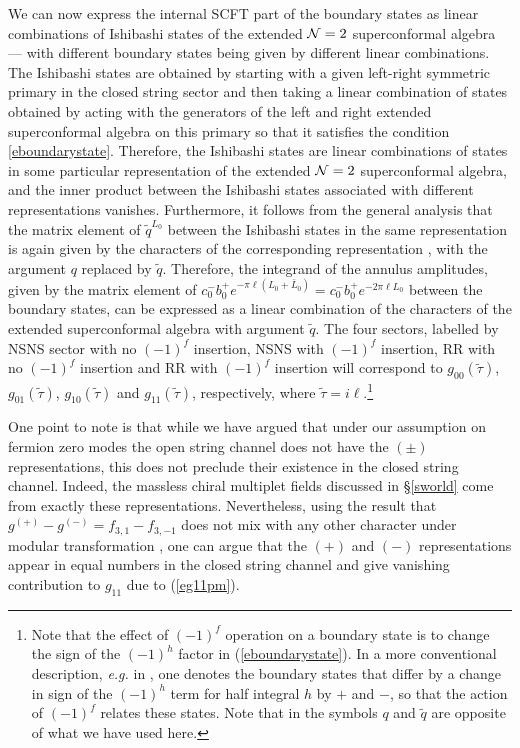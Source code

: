 \documentclass[12pt,a4paper]{article}
\newcommand{\refb}[1]{(\ref{#1})}
\newcommand{\NN}{{\cal N}}
\def\ttau{\tilde\tau}
\begin{document}
We can now express the internal SCFT part of the boundary states as
linear combinations of Ishibashi states \cite{Ishibashi:1988kg} of the
extended $\NN=2$ superconformal algebra --- with different boundary states being given by different linear
combinations. The Ishibashi states are obtained by starting with a given left-right
symmetric primary in the closed string sector and then taking a linear combination
of states obtained by acting with the generators of the left and right extended superconformal
algebra on this primary so that it satisfies the condition \eqref{eboundarystate}.
Therefore, the Ishibashi states are linear combinations of states in some particular
representation of the extended $\NN=2$ superconformal algebra, and the inner product between the Ishibashi states
associated with different representations vanishes. Furthermore, it follows from the general
analysis that the matrix element of $\tilde q^{L_0}$ between the Ishibashi states in the same
representation is again given by the characters of the corresponding
representation \cite{Recknagel:1997sb}, with the argument $q$ replaced by $\tilde q$.
Therefore, the integrand of the annulus amplitudes, given by the matrix element of
$c_0^-b_0^+e^{-\pi\ell (L_0+\bar L_0)}=c_0^-b_0^+ e^{-2\pi\ell L_0}$
between the boundary states, can be expressed as a linear combination of the characters of the extended superconformal
algebra with argument $\tilde q$. The four sectors,
labelled by NSNS sector with no $(-1)^f$ insertion, NSNS with $(-1)^f$ insertion, RR with
no $(-1)^f$ insertion and RR with $(-1)^f$ insertion will correspond to $g_{00}(\ttau)$,
$g_{01}(\ttau)$, $g_{10}(\ttau)$ and $g_{11}(\ttau)$, respectively, where
$\ttau=i\ell$.\footnote{Note that the effect
of $(-1)^f$ operation on a boundary state is to change the sign of the $(-1)^h$ factor in
\refb{eboundarystate}. In a more conventional description, {\it e.g.} in \cite{Quiroz:2001xz},
one denotes the boundary states
that differ by a change in sign of the $(-1)^h$ term for half integral $h$ by $+$ and $-$,
so that the action of $(-1)^f$ relates these states.
Note that in \cite{Quiroz:2001xz} the symbols $q$ and $\tilde q$ are opposite of what we have used here.}

One point to note is that while we have argued
that under our assumption on fermion zero modes the open string channel does not have
the $(\pm)$ representations, this does not preclude their existence in the closed string channel.
Indeed, the massless chiral multiplet fields discussed in \S\ref{sworld}
come from exactly these representations.
Nevertheless, using the result that $g^{(+)}-g^{(-)}= f_{3,1}-f_{3,-1}$ does not mix with any
other character under modular transformation \cite{Odake:1989dm},
one can argue that the $(+)$ and $(-)$ representations appear in equal numbers in the closed string channel and give
vanishing  contribution to $g_{11}$ due to \refb{eg11pm}.
\end{document}
